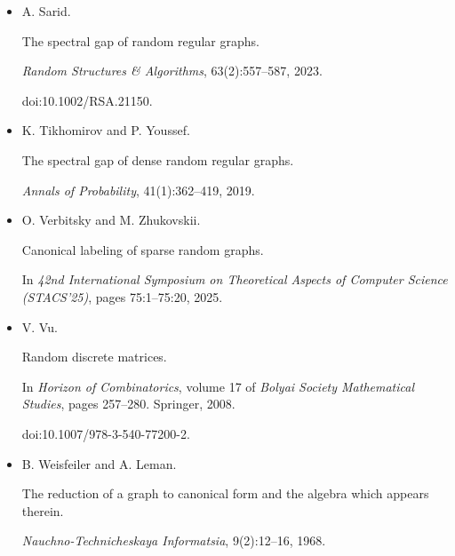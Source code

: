 \documentclass[10pt,a4paper]{article}
\begin{document}
\begin{itemize}
\item[] 
[45]

A. Sarid.


The spectral gap of random regular graphs.


\emph{Random Structures \& Algorithms}, 63(2):557–587, 2023.


doi:10.1002/RSA.21150.





\item[] 
[46]

K. Tikhomirov and P. Youssef.


The spectral gap of dense random regular graphs.


\emph{Annals of Probability}, 41(1):362–419, 2019.





\item[] 
[47]

O. Verbitsky and M. Zhukovskii.


Canonical labeling of sparse random graphs.


In \emph{42nd International Symposium on Theoretical Aspects of
Computer Science (STACS’25)}, pages 75:1–75:20, 2025.





\item[] 
[48]

V. Vu.


Random discrete matrices.


In \emph{Horizon of Combinatorics}, volume 17 of \emph{Bolyai Society
Mathematical Studies}, pages 257–280. Springer, 2008.


doi:10.1007/978-3-540-77200-2.





\item[] 
[49]

B. Weisfeiler and A. Leman.


The reduction of a graph to canonical form and the algebra which
appears therein.


\emph{Nauchno-Technicheskaya Informatsia}, 9(2):12–16, 1968.





\end{itemize}
\end{document}
